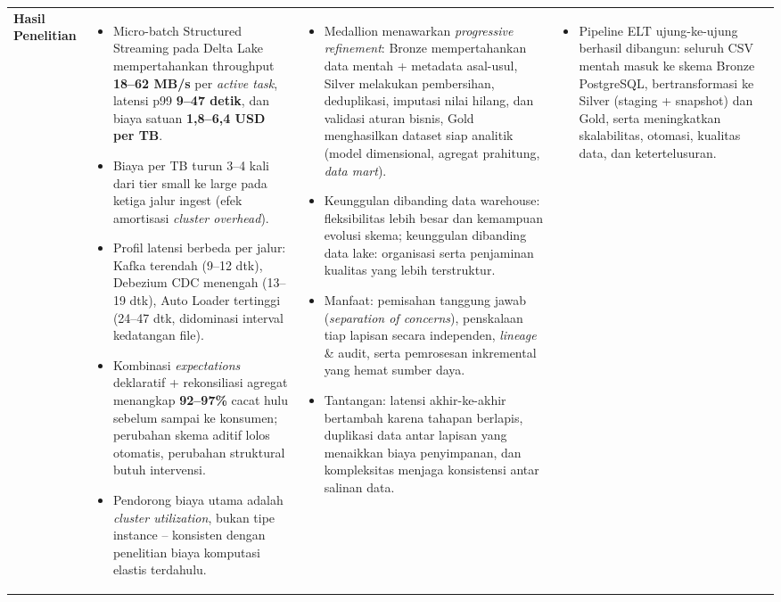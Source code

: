 \documentclass[11pt,a4paper]{article}
\newenvironment{cellitems}
  {\vspace{-2pt}\begin{itemize}\setlength{\itemsep}{1.5pt}\setlength{\parskip}{0pt}\setlength{\topsep}{1pt}}
  {\end{itemize}\vspace{-2pt}}
\begin{document}
\begin{longtable}{|L{2.5cm}|L{7.65cm}|L{7.65cm}|L{7.65cm}|}
\textbf{Hasil Penelitian} &
\begin{cellitems}
  \item Micro-batch Structured Streaming pada Delta Lake mempertahankan throughput \textbf{18--62 MB/s} per \textit{active task}, latensi p99 \textbf{9--47 detik}, dan biaya satuan \textbf{1,8--6,4 USD per TB}.
  \item Biaya per TB turun 3--4 kali dari tier small ke large pada ketiga jalur ingest (efek amortisasi \textit{cluster overhead}).
  \item Profil latensi berbeda per jalur: Kafka terendah (9--12 dtk), Debezium CDC menengah (13--19 dtk), Auto Loader tertinggi (24--47 dtk, didominasi interval kedatangan file).
  \item Kombinasi \textit{expectations} deklaratif + rekonsiliasi agregat menangkap \textbf{92--97\%} cacat hulu sebelum sampai ke konsumen; perubahan skema aditif lolos otomatis, perubahan struktural butuh intervensi.
  \item Pendorong biaya utama adalah \textit{cluster utilization}, bukan tipe instance -- konsisten dengan penelitian biaya komputasi elastis terdahulu.
\end{cellitems} &
\begin{cellitems}
  \item Medallion menawarkan \textit{progressive refinement}: Bronze mempertahankan data mentah + metadata asal-usul, Silver melakukan pembersihan, deduplikasi, imputasi nilai hilang, dan validasi aturan bisnis, Gold menghasilkan dataset siap analitik (model dimensional, agregat prahitung, \textit{data mart}).
  \item Keunggulan dibanding data warehouse: fleksibilitas lebih besar dan kemampuan evolusi skema; keunggulan dibanding data lake: organisasi serta penjaminan kualitas yang lebih terstruktur.
  \item Manfaat: pemisahan tanggung jawab (\textit{separation of concerns}), penskalaan tiap lapisan secara independen, \textit{lineage} \& audit, serta pemrosesan inkremental yang hemat sumber daya.
  \item Tantangan: latensi akhir-ke-akhir bertambah karena tahapan berlapis, duplikasi data antar lapisan yang menaikkan biaya penyimpanan, dan kompleksitas menjaga konsistensi antar salinan data.
\end{cellitems} &
\begin{cellitems}
  \item Pipeline ELT ujung-ke-ujung berhasil dibangun: seluruh CSV mentah masuk ke skema Bronze PostgreSQL, bertransformasi ke Silver (staging + snapshot) dan Gold, serta meningkatkan skalabilitas, otomasi, kualitas data, dan ketertelusuran.

\end{cellitems}
\end{longtable}
\end{document}
